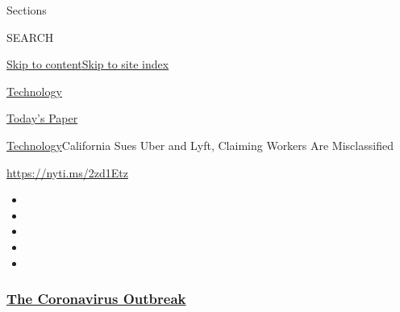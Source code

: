Sections

SEARCH

\protect\hyperlink{site-content}{Skip to
content}\protect\hyperlink{site-index}{Skip to site index}

\href{https://www.nytimes3xbfgragh.onion/section/technology}{Technology}

\href{https://myaccount.nytimes3xbfgragh.onion/auth/login?response_type=cookie\&client_id=vi}{}

\href{https://www.nytimes3xbfgragh.onion/section/todayspaper}{Today's
Paper}

\href{/section/technology}{Technology}\textbar{}California Sues Uber and
Lyft, Claiming Workers Are Misclassified

\url{https://nyti.ms/2zd1Etz}

\begin{itemize}
\item
\item
\item
\item
\item
\end{itemize}

\hypertarget{the-coronavirus-outbreak}{%
\subsubsection{\texorpdfstring{\href{https://www.nytimes3xbfgragh.onion/news-event/coronavirus?name=styln-coronavirus-markets\&region=TOP_BANNER\&block=storyline_menu_recirc\&action=click\&pgtype=Article\&impression_id=4c388c30-f1f4-11ea-9ee4-4b0f9d7721fd\&variant=undefined}{The
Coronavirus
Outbreak}}{The Coronavirus Outbreak}}\label{the-coronavirus-outbreak}}


